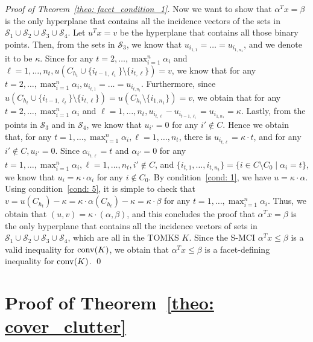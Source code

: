 \begin{appendices}
\begin{proof}[Proof of Theorem~\ref{theo: facet_condition_1}]
Now we want to show that $\alpha^T x = \beta$ is the only hyperplane that contains all the incidence vectors of the sets in $\mathscr{S}_1 \cup \mathscr{S}_2 \cup \mathscr{S}_3 \cup \mathscr{S}_4$. 
Let $u^T x = v$ be the hyperplane that contains all those binary points. 
Then, from the sets in $\mathscr{S}_3$, we know that $u_{i_{1,1}} = \ldots = u_{i_{1,n_1}}$, and we denote it to be $\kappa$. Since for any $t = 2, \ldots, \max_{i=1}^n \alpha_i$ and $\ell = 1, \ldots, n_t, u(C_{h_t} \cup \{i_{t-1, \ell_t}\} \setminus \{i_{t, \ell}\}) = v$, we know that for any $t = 2, \ldots, \max_{i=1}^n \alpha_i, u_{i_{t,1}} = \ldots = u_{i_{t, n_t}}$. Furthermore, since $u(C_{h_t} \cup \{i_{t-1, \ell_t}\} \setminus \{i_{t, \ell}\}) = u(C_{h_t} \setminus \{i_{1,n_1}\}) = v$, we obtain that for any $t = 2, \ldots, \max_{i=1}^n \alpha_i$ and $\ell = 1, \ldots, n_t, u_{i_{t,\ell}} - u_{i_{t-1, \ell_t}} = u_{i_{1,n_1}} = \kappa$. 
Lastly, from the points in $\mathscr{S}_3$ and in $\mathscr{S}_4$, we know that $u_{i'} = 0$ for any $i' \notin C$. 
Hence we obtain that, for any $t = 1, \ldots, \max_{i=1}^n \alpha_i, \ell = 1, \ldots, n_t$, there is $u_{i_{t,\ell}} = \kappa \cdot t$, and for any $i' \notin C, u_{i'} = 0$. 
Since $\alpha_{i_{t,\ell}} = t$ and $\alpha_{i'} = 0$ for any $t = 1, \ldots, \max_{i=1}^n \alpha_i, \ell = 1, \ldots, n_t, i' \notin C$, 
and $\{i_{t, 1}, \ldots, i_{t, n_t}\} = \{i \in C \setminus C_0 \mid \alpha_i = t\}$,
we know that $u_i = \kappa \cdot \alpha_i$ for any $i \notin C_0$. 
By condition~\ref{cond: 1}, we have $u = \kappa \cdot \alpha$. 
Using condition~\ref{cond: 5}, it is simple to check that $v = u(C_{h_t}) - \kappa = \kappa \cdot \alpha(C_{h_t}) - \kappa = \kappa \cdot \beta$ for any $t = 1, \ldots, \max_{i=1}^n \alpha_i$.
Thus, we obtain that $(u,v) = \kappa \cdot (\alpha, \beta)$, and this concludes the proof that $\alpha^T x = \beta$ is the only hyperplane that contains all the incidence vectors of sets in $\mathscr{S}_1 \cup \mathscr{S}_2 \cup \mathscr{S}_3 \cup \mathscr{S}_4$, which are all in the TOMKS $K$. 
Since the S-MCI $\alpha^T x \leq \beta$ is a valid inequality for $\operatorname{conv}(K)$, we obtain that $\alpha^T x \leq \beta$ is a facet-defining inequality for $\operatorname{conv}(K)$. 
\qed \end{proof}



\section{Proof of Theorem~\ref{theo: cover_clutter}}
\label{subsec: proof_cover_clutter}


\end{appendices}
